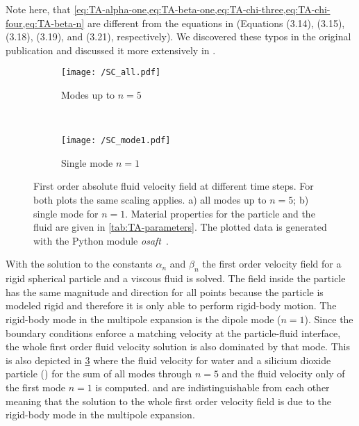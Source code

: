 Note here, that 
\cref{eq:TA-alpha-one,eq:TA-beta-one,eq:TA-chi-three,eq:TA-chi-four,eq:TA-beta-n} 
are different from the equations in  (Equations 
(3.14), (3.15), (3.18), (3.19), and (3.21), respectively). We discovered these 
typos in the original publication and discussed it more extensively in 
.

\begin{figure}
  \centering
  \begin{subfigure}[b]{\textwidth}
    \centering
    \caption{Modes up to $n=5$}
    \texttt{[image: /SC\_all.pdf]}
    \label{fig:TA-SC_all}
  \end{subfigure}\\%
  \begin{subfigure}[b]{\textwidth}
    \centering
    \caption{Single mode $n=1$}
    \texttt{[image: /SC\_mode1.pdf]}
    \label{fig:TA-SC_mode1}
  \end{subfigure}
  \caption{First order absolute fluid velocity field at different time steps. 
  For both plots the same scaling applies. a) all modes up to $n=5$; b) single 
  mode for $n=1$. Material properties for the particle and the fluid are given 
in \cref{tab:TA-parameters}. The plotted data is generated with the Python 
module \emph{osaft}~\cite{FankhauserPython2022}.}
  \label{fig:TA-SC}
\end{figure}

With the solution to the constants $\alpha_{n}$ and $\beta_{n}$ the first order 
velocity field for a rigid spherical particle and a viscous fluid is solved. 
The field inside the particle has the same magnitude and direction for all 
points because the particle is modeled rigid and therefore it is only able to 
perform rigid-body motion. The rigid-body mode in the multipole expansion is 
the dipole mode ($n=1$). Since the boundary conditions enforce a matching 
velocity at the particle-fluid interface, the whole first order fluid velocity 
solution is also dominated by that mode. This is also depicted in 
\cref{fig:TA-SC} where the fluid velocity for water and a silicium dioxide 
particle (\SiO) for the sum of all modes through $n=5$ and the fluid velocity 
only of the first mode $n=1$ is computed.  and 
 are indistinguishable from each other meaning that the 
solution to the whole first order velocity field is due to the rigid-body mode 
in the multipole expansion.

